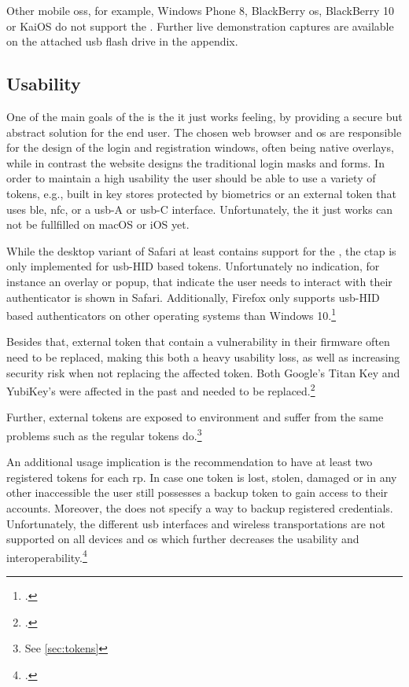 Other mobile \glspl{os}, for example, Windows Phone 8, BlackBerry \gls{os}, BlackBerry 10 or KaiOS do not support the \wa. Further live demonstration captures are available on the attached \gls{usb} flash drive in the appendix.

\subsection{Usability}

One of the main goals of the \wa{} is the \frqq it just works\flqq{} feeling, by providing a secure but abstract solution for the end user. The chosen web browser and \gls{os} are responsible for the design of the login and registration windows, often being native overlays, while in contrast the website designs the traditional login masks and forms. In order to maintain a high usability the user should be able to use a variety of tokens, e.g., built in key stores protected by biometrics or an external token that uses \gls{ble}, \gls{nfc}, or a \gls{usb}-A or \gls{usb}-C interface. Unfortunately, the \frqq it just works\flqq{} can not be fullfilled on macOS or iOS yet.

While the desktop variant of Safari at least contains support for the \wa, the \gls{ctap} is only implemented for \gls{usb}-HID based tokens. Unfortunately no indication, for instance an overlay or popup, that indicate the user needs to interact with their authenticator is shown in Safari. Additionally, Firefox only supports \gls{usb}-HID based authenticators on other operating systems than Windows 10.\footcites[See][]{rust-authenticator}

Besides that, external token that contain a vulnerability in their firmware often need to be replaced, making this both a heavy usability loss, as well as increasing security risk when not replacing the affected token. Both Google's Titan Key and YubiKey's were affected in the past and needed to be replaced.\footcites[See][]{yubikey-heise}[See][]{titan-key}

Further, external tokens are exposed to environment and suffer from the same problems such as the regular tokens do.\footnote{See \autoref{sec:tokens}}

An additional usage implication is the recommendation to have at least two registered tokens for each \gls{rp}. In case one token is lost, stolen, damaged or in any other inaccessible the user still possesses a backup token to gain access to their accounts. Moreover, the \wa{} does not specify a way to backup registered credentials. Unfortunately, the different \gls{usb} interfaces and wireless transportations are not supported on all devices and \gls{os} which further decreases the usability and interoperability.\footcites[See][Chapter 13.6]{w3c}[See][15]{das2018johnny}

